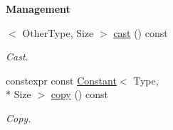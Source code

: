 \begin{Indent}{\bf Management}
\begin{DoxyCompactItemize}
$<$ Other\-Type, Size $>$ \hyperlink{exceptionmagrathea_1_1Constant_ac5eda81fca344c527b578cebf98078a7}{cast} () const 
\begin{DoxyCompactList}\small\item\em Cast. \end{DoxyCompactList}\item 
constexpr const \hyperlink{exceptionmagrathea_1_1Constant}{Constant}$<$ Type, \\*
Size $>$ \hyperlink{exceptionmagrathea_1_1Constant_a6bdff2e37ad703e4e7edf09a690341fa}{copy} () const 
\begin{DoxyCompactList}\small\item\em Copy. \end{DoxyCompactList}\end{DoxyCompactItemize}
\end{Indent}
